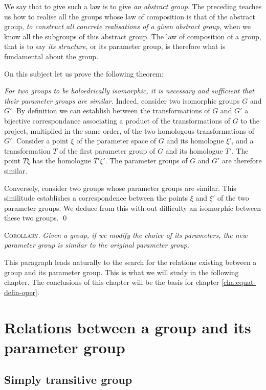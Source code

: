 \documentclass[leqno,11pt]{book}
\numberwithin{equation}{chapter}
\theoremstyle{shape1}
\theoremstyle{shapesmall}
\newcommand{\somespace}{\vspace{9pt}}
\begin{document}
We say that to give such a law is to give \emph{an abstract group}. The preceding teaches us how to realise all the groups whose law of composition is that of the abstract group, \emph{to construct all concrete realisations of a given abstract group}, when we know all the subgroups of this abstract group. The law of composition of a group, that is to say \emph{its structure}, or its parameter group, is therefore what is fundamental about the group.

On this subject let us prove the following theorem:

\somespace

\emph{For two groups to be holoedrically isomorphic, it is necessary and sufficient that their parameter groups are similar.} Indeed, consider two isomorphic groups $G$ and $G'$. By definition we can establish between the transformations of $G$ and $G'$ a bijective correspondance associating a product of the transformations of $G$ to the project, multiplied in the same order, of the two homologous transformations of $G'$. Consider a point $\xi$ of the parameter space of $G$ and its homologue $\xi'$, and a transformation $T$ of the first parameter group of $G$ and its homologue $T'$. The point $T\xi$ has the homologue $T'\xi'$. The parameter groups of $G$ and $G'$ are therefore similar.

Conversely, consider two groups whose parameter groups are similar. This similitude establishes a correspondence between the points $\xi$ and $\xi'$ of the two parameter groups. We deduce from this with out difficulty an isomorphic between these two groups.
\qed

\somespace

\textsc{Corollary.} \emph{Given a group, if we modify the choice of its parameters, the new parameter group is similar to the original parameter group.}

\somespace

This paragraph leads naturally to the search for the relations existing between a group and its parameter group. This is what we will study in the following chapter. The conclusions of this chapter will be the basis for chapter \ref{cha:equat-defin-oper}.

\chapter{Relations between a group and its parameter group}
\label{cha:relat-betw-group}

\section{Simply transitive group}
\label{sec:simply-trans-group}
\end{document}
